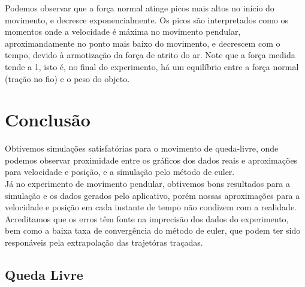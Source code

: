 \documentclass{article}
\begin{document}
Podemos observar que a força normal atinge picos mais altos no início do movimento, e decresce exponencialmente. Os picos são interpretados como os momentos onde a velocidade é máxima no movimento pendular, aproximandamente no ponto mais baixo do movimento, e decrescem com o tempo, devido à armotização da força de atrito do ar. Note que a força medida tende a 1, isto é, no final do experimento, há um equilíbrio entre a força normal (tração no fio) e o peso do objeto.

\section{Conclusão}

Obtivemos simulações satisfatórias para o movimento de queda-livre, onde podemos observar proximidade entre os gráficos dos dados reais e aproximações para velocidade e posição, e a simulação pelo método de euler.\\

Já no experimento de movimento pendular, obtivemos bons resultados para a simulação e os dados gerados pelo aplicativo, porém nossas aproximações para a velocidade e posição em cada instante de tempo não condizem com a realidade. Acreditamos que os erros têm fonte na imprecisão dos dados do experimento, bem como a baixa taxa de convergência do método de euler, que podem ter sido responáveis pela extrapolação das trajetóras traçadas.

\subsection{Queda Livre}
\end{document}
